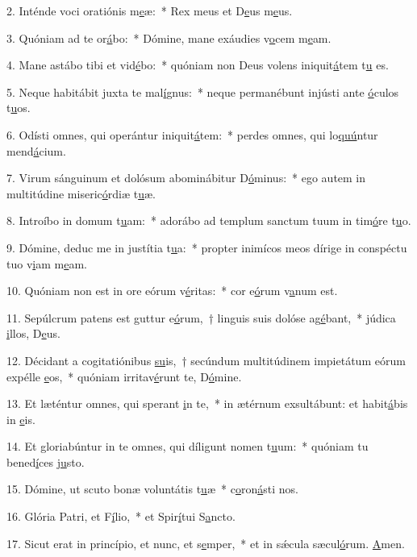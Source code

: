 2. Inténde voci oratiónis m\uline{e}æ:~* Rex meus et D\uline{e}us m\uline{e}us.\par 
3. Quóniam ad te or\uline{á}bo:~* Dómine, mane exáudies v\uline{o}cem m\uline{e}am.\par 
4. Mane astábo tibi et vid\uline{é}bo:~* quóniam non Deus volens iniquit\uline{á}tem t\uline{u} es.\par 
5. Neque habitábit juxta te mal\uline{í}gnus:~* neque permanébunt injústi ante \uline{ó}culos t\uline{u}os.\par 
6. Odísti omnes, qui operántur iniquit\uline{á}tem:~* perdes omnes, qui lo\uline{quú}ntur mend\uline{á}cium.\par 
7. Virum sánguinum et dolósum abominábitur D\uline{ó}minus:~* ego autem in multitúdine miseric\uline{ó}rdiæ t\uline{u}æ.\par 
8. Introíbo in domum t\uline{u}am:~* adorábo ad templum sanctum tuum in tim\uline{ó}re t\uline{u}o.\par 
9. Dómine, deduc me in justítia t\uline{u}a:~* propter inimícos meos dírige in conspéctu tuo v\uline{i}am m\uline{e}am.\par 
10. Quóniam non est in ore eórum v\uline{é}ritas:~* cor e\uline{ó}rum v\uline{a}num est.\par 
11. Sepúlcrum patens est guttur e\uline{ó}rum,~† linguis suis dolóse ag\uline{é}bant,~* júdica \uline{i}llos, D\uline{e}us.\par 
12. Décidant a cogitatiónibus \uline{su}is,~† secúndum multitúdinem impietátum eórum expélle \uline{e}os,~* quóniam irritav\uline{é}runt te, D\uline{ó}mine.\par 
13. Et læténtur omnes, qui sperant \uline{i}n te,~* in ætérnum exsultábunt: et habit\uline{á}bis in \uline{e}is.\par 
14. Et gloriabúntur in te omnes, qui díligunt nomen t\uline{u}um:~* quóniam tu bened\uline{í}ces j\uline{u}sto.\par 
15. Dómine, ut scuto bonæ voluntátis t\uline{u}æ~* c\uline{o}ron\uline{á}sti nos.\par 
16. Glória Patri, et F\uline{í}lio,~* et Spir\uline{í}tui S\uline{a}ncto.\par 
17. Sicut erat in princípio, et nunc, et s\uline{e}mper,~* et in sǽcula sæcul\uline{ó}rum. \uline{A}men.\par 
